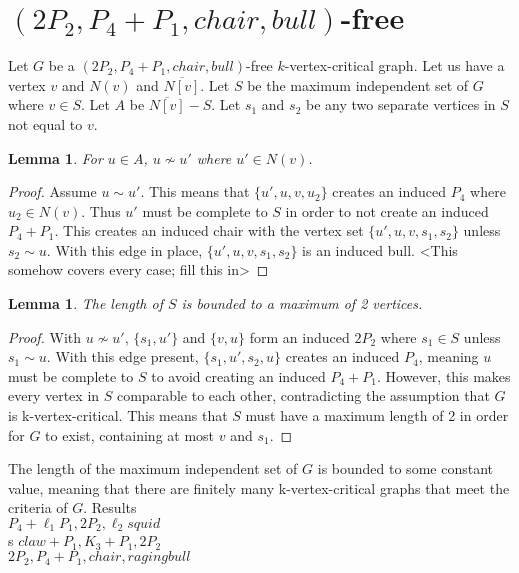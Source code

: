 \documentclass[11pt]{article}
\newtheorem{lemma}[theorem]{Lemma}
\theoremstyle{definition}
\newcommand{\noneighbs}{\overline{N[v]}}
\begin{document}
\section{$(2P_2, P_4 + P_1, chair, bull)$-free}
Let $G$ be a $(2P_2, P_4 + P_1, chair, bull)$-free $k$-vertex-critical graph. Let us have a vertex $v$ and $N(v)$ and $\noneighbs$. Let $S$ be the maximum independent set of $G$ where $v \in S$. Let $A$ be $\noneighbs - S$. Let $s_1$ and $s_2$ be any two separate vertices in $S$ not equal to $v$.
\begin{lemma}\label{lem:chairBullOne}
For $u \in A$, $u \not \sim u'$ where $u' \in N(v)$.
\end{lemma}
\begin{proof}
Assume $u \sim u'$. This means that $\{u', u, v, u_2\}$ creates an induced $P_4$ where $u_2 \in N(v)$. Thus $u'$ must be complete to $S$ in order to not create an induced $P_4 + P_1$. This creates an induced chair with the vertex set $\{u', u, v, s_1, s_2\}$ unless $s_2 \sim u$. With this edge in place, $\{u', u, v, s_1, s_2\}$ is an induced bull. <This somehow covers every case; fill this in>
\end{proof}
\begin{lemma}\label{lem:chairBullTwo}
The length of $S$ is bounded to a maximum of 2 vertices.
\end{lemma}
\begin{proof}
With $u \not \sim u'$, $\{s_1, u'\}$ and $\{v, u\}$ form an induced $2P_2$ where $s_1 \in S$ unless $s_1 \sim u$. With this edge present, $\{s_1, u', s_2, u\}$ creates an induced $P_4$, meaning $u$ must be complete to $S$ to avoid creating an induced $P_4 + P_1$. However, this makes every vertex in $S$ comparable to each other, contradicting the assumption that $G$ is k-vertex-critical. This means that $S$ must have a maximum length of 2 in order for $G$ to exist, containing at most $v$ and $s_1$.
\end{proof}
The length of the maximum independent set of $G$ is bounded to some constant value, meaning that there are finitely many k-vertex-critical graphs that meet the criteria of $G$.
Results\\
$P_4 + \ell_1 P_1, 2P_2, \ell_2 squid$\\s
$claw + P_1, K_3 + P_1, 2P_2$\\
$2P_2, P_4 + P_1, chair, raging bull$
\end{document}
